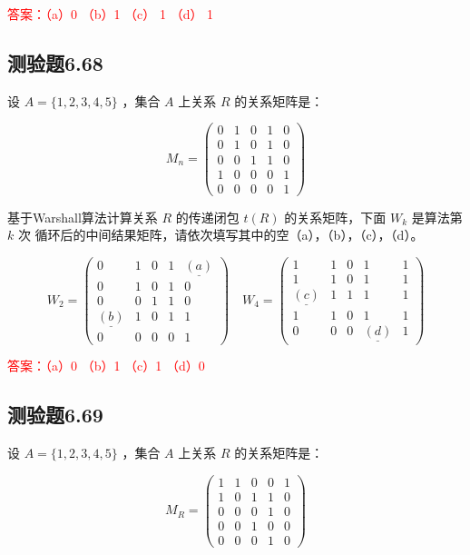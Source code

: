 \documentclass[UTF8, heading=true]{ctexart}
\begin{document}
\textcolor{red}{答案：（a）0 （b）1 （c） 1 （d） 1}

\subsection{测验题6.68}

设 $A=\{1,2,3,4,5\}$ ，集合 $A$ 上关系 $R$ 的关系矩阵是：

$$
M_n=\left(\begin{array}{ccccc}
0 & 1 & 0 & 1 & 0 \\
0 & 1 & 0 & 1 & 0 \\
0 & 0 & 1 & 1 & 0 \\
1 & 0 & 0 & 0 & 1 \\
0 & 0 & 0 & 0 & 1
\end{array}\right)
$$


基于Warshall算法计算关系 $R$ 的传递闭包 $t(R)$ 的关系矩阵，下面 $W_k$ 是算法第 $k$ 次
循环后的中间结果矩阵，请依次填写其中的空（a），（b），（c），（d）。

$$
W_2=\left(\begin{array}{ccccc}
0 & 1 & 0 & 1 & \underline{(a)} \\
0 & 1 & 0 & 1 & 0 \\
0 & 0 & 1 & 1 & 0 \\
\underline{(b)} & 1 & 0 & 1 & 1 \\
0 & 0 & 0 & 0 & 1
\end{array}\right) \quad W_4=\left(\begin{array}{ccccc}
1 & 1 & 0 & 1 & 1 \\
1 & 1 & 0 & 1 & 1 \\
\underline{(c)} & 1 & 1 & 1 & 1 \\
1 & 1 & 0 & 1 & 1 \\
0 & 0 & 0 & \underline{(d)} & 1
\end{array}\right)
$$

\textcolor{red}{答案：（a）0 （b）1 （c）1 （d）0}


\subsection{测验题6.69}

设 $A=\{1,2,3,4,5\}$ ，集合 $A$ 上关系 $R$ 的关系矩阵是：

$$M_R=\left(\begin{array}{lllll}1 & 1 & 0 & 0 & 1 \\ 1 & 0 & 1 & 1 & 0 \\ 0 & 0 & 0 & 1 & 0 \\ 0 & 0 & 1 & 0 & 0 \\ 0 & 0 & 0 & 1 & 0\end{array}\right)$$
\end{document}
